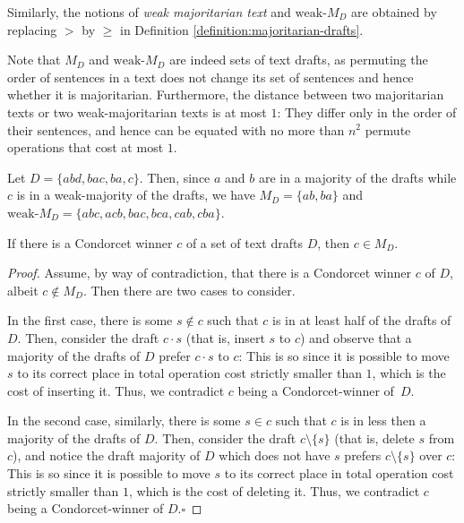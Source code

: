 \documentclass[sigconf]{aamas}  %
\newcommand{\qqed}{\hfill$\square$}
\begin{document}
Similarly, the notions of \emph{weak majoritarian text} and $\textrm{weak-}M_D$ are obtained by replacing $>$  by $\ge$ in Definition \ref{definition:majoritarian-drafts}.

Note that $M_D$ and $\textrm{weak-}M_D$ are indeed sets of text drafts, as permuting  the order of sentences in a text does not change its set of sentences and hence whether it is majoritarian. Furthermore, the distance between two majoritarian texts or two weak-majoritarian texts is at most $1$: They differ only in the order of their sentences, and hence can be equated with no more than $n^2$ permute operations that cost at most $1$.

\begin{example}
%
Let $D = \{abd, bac, ba, c\}$. Then, since $a$ and $b$ are in a majority of the drafts while $c$ is in a weak-majority of the drafts, we have $M_D = \{ab, ba\}$ and $\textrm{weak-}M_D = \{abc, acb, bac, bca, cab, cba\}$.
%
\end{example}

\begin{lemma}\label{lemma:cinmd}
  If there is a Condorcet winner $c$ of a set of text drafts $D$, then $c \in M_D$.
\end{lemma}

\begin{proof}
%
Assume, by way of contradiction, that there is a Condorcet winner $c$ of $D$, albeit $c \notin M_D$. Then there are two cases to consider.

In the first case, there is some $s \notin c$ such that $c$ is in at least half of the drafts of $D$. Then, consider the draft $c \cdot s$ (that is, insert $s$ to $c$) and observe that a majority of the drafts of $D$ prefer $c \cdot s$ to $c$:
  This is so since it is possible to move $s$ to its correct place in total operation cost strictly smaller than $1$, which is the cost of inserting it. Thus, we contradict $c$ being a Condorcet-winner of~$D$.

In the second case, similarly, there is some $s \in c$ such that $c$ is in less then a majority of the drafts of $D$. Then, consider the draft $c \setminus \{s\}$ (that is, delete $s$ from $c$), and notice the draft majority of $D$ which does not have $s$ prefers $c \setminus \{s\}$ over $c$:
  This is so since it is possible to move $s$ to its correct place in total operation cost strictly smaller than $1$, which is the cost of deleting it. Thus, we contradict $c$ being a Condorcet-winner of $D$.\qqed
%
\end{proof}
\end{document}

